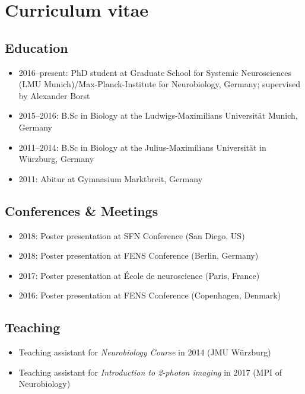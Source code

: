 \chapter*{Curriculum vitae}

\section*{Education}

\begin{itemize}
    \item 2016--present: PhD student at Graduate School for Systemic Neurosciences (LMU Munich)/Max-Planck-Institute for Neurobiology, Germany; supervised by Alexander Borst
    
    \item 2015--2016: B.Sc in Biology at the Ludwigs-Maximilians Universität Munich, Germany
    
    \item 2011--2014: B.Sc in Biology at the Julius-Maximilians Universität in Würzburg, Germany
    
    \item 2011: Abitur at Gymnasium Marktbreit, Germany
\end{itemize}

\section*{Conferences \& Meetings}

\begin{itemize}
     \item 2018: Poster presentation at SFN Conference (San Diego, US)
     \item 2018: Poster presentation at FENS Conference (Berlin, Germany)
     \item 2017: Poster presentation at École de neuroscience (Paris, France)
     \item 2016: Poster presentation at FENS Conference (Copenhagen, Denmark)

\end{itemize}

\section*{Teaching}

\begin{itemize}
     \item Teaching assistant for \textit{Neurobiology Course} in 2014 (JMU Würzburg)
     \item Teaching assistant for \textit{Introduction to 2-photon imaging} in 2017 (MPI of Neurobiology)
\end{itemize}

